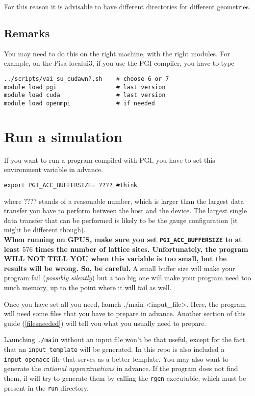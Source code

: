 For this reason it is advisable to have different directories for different 
geometries.

\subsection{Remarks} 
You may need to do this on the right machine, with the right modules.
For example, on the Pisa localui3, if you use the PGI compiler,
you have to type
\begin{verbatim}
../scripts/vai_su_cudawn?.sh    # choose 6 or 7
module load pgi                 # last version
module load cuda                # last version
module load openmpi             # if needed 
\end{verbatim}

\section{Run a simulation}

If you want to run a program compiled with PGI, you have to set this 
environment variable in advance.
\begin{verbatim}
export PGI_ACC_BUFFERSIZE= ???? #think
\end{verbatim}
where $????$ stands of a reasonable number, which is larger than the largest 
data transfer you have to perform between the host and the device. The largest 
single data transfer that can be performed is likely to be the gauge 
configuration (it might be different though). \\
{ \bf When running on GPUS, make sure you set \verb|PGI_ACC_BUFFERSIZE| to at 
    least $576$ times the number of lattice sites. Unfortunately, the program WILL 
    NOT TELL YOU when this variable is too small, but the results will be wrong. 
So, be careful.}
A small buffer size will make your program fail (\emph{possibly silently}) 
but a too big one will make your program need too much memory, up to the point 
where it will fail as well.


Once you have set all you need, launch 
{\sf ./main <input\_file>}. Here, the program 
will  need some  files that you have to prepare in advance. Another section
of this guide (\ref{filesneeded}) will tell you what you usually need to 
prepare.

Launching \verb|./main| without an input file won't be that useful,
except for the fact that an \verb|input_template| will be generated.
In this repo is also included a \verb|input_openacc| file that serves as
a better template.
You may also want to generate the \emph{rational approximations} in advance. If 
the
program does not find them, il will try to generate them by calling 
the \verb|rgen| executable, which must be present in the \verb|run| directory.

